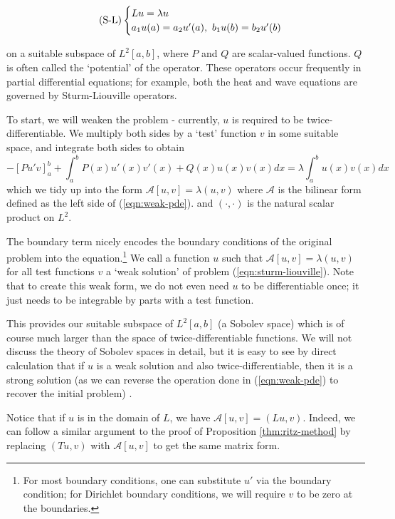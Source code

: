\documentclass[../main.tex]{subfiles}
\begin{document}
\begin{equation*}\label{eqn:sturm-liouville}
\tag{S-L}
\begin{cases}
Lu = \lambda u$$ \\
a_1 u(a) = a_2 u'(a), \ b_1 u(b) = b_2 u'(b)
\end{cases}
\end{equation*}

on a suitable subspace of $L^2[a, b]$, where $P$ and $Q$ are scalar-valued
functions. $Q$ is often called the `potential' of the operator. These operators
occur frequently in partial differential equations; for example, both the heat
and wave equations are governed by Sturm-Liouville operators.

To start, we will weaken the problem - currently, $u$ is required to be
twice-differentiable. We multiply both sides by a `test' function $v$ in some
suitable space, and integrate both sides to obtain
\begin{equation}\label{eqn:weak-pde}
-[Pu'v]^b_a + \int_a^b P(x) u'(x) v'(x) + Q(x) u(x) v(x) dx = \lambda \int_a^b u(x) v(x) dx
\end{equation}
which we tidy up into the form 
$\mathcal{A}[u, v] = \lambda (u, v)$
where $\mathcal{A}$ is the bilinear form defined as the left side of
(\ref{eqn:weak-pde}). and $(\cdot, \cdot)$ is the natural scalar product on
$L^2$.

The boundary term nicely encodes the boundary conditions of the original
problem into the equation.\footnote{For most boundary conditions, one can
substitute $u'$ via the boundary condition; for Dirichlet boundary conditions,
we will require $v$ to be zero at the boundaries.} We call a function $u$ such
that $\mathcal{A}[u, v] = \lambda (u, v)$ for all test functions $v$ a `weak
solution' of problem (\ref{eqn:sturm-liouville}). Note that to create this weak
form, we do not even need $u$ to be differentiable once; it just needs to be
integrable by parts with a test function.

This provides our suitable subspace of $L^2[a, b]$ (a Sobolev space) which is of
course much larger than the space of twice-differentiable functions. We will not
discuss the theory of Sobolev spaces in detail, but it is easy to see by direct
calculation that if $u$ is a weak solution and also twice-differentiable, then
it is a strong solution (as we can reverse the operation done in
(\ref{eqn:weak-pde}) to recover the initial problem)
\cite{brezis2011functional}.

Notice that if $u$ is in the domain of $L$, we have $\mathcal{A}[u, v] = (Lu,
v)$. Indeed, we can follow a similar argument to the proof of Proposition \ref{thm:ritz-method}
by replacing $(Tu, v)$ with $\mathcal{A}[u, v]$ to get the same matrix form.
\end{document}
